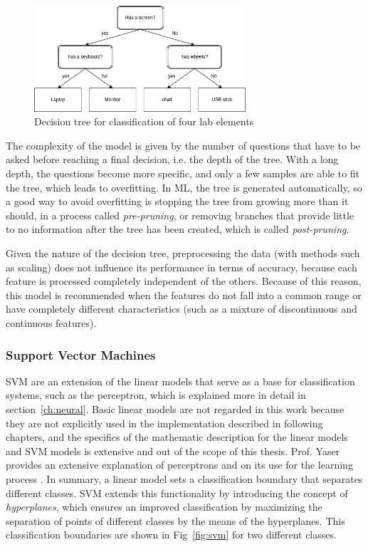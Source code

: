 \begin{figure}[!htb]
    \centering
      \includegraphics[width=0.7\textwidth]{figures/dt_example}
      \caption{Decision tree for classification of four lab elements}
      \label{fig:dt_example}
\end{figure}

The complexity of the model is given by the number of questions that have to be asked before reaching a final decision, i.e. the depth of the tree. With a long depth, the questions become more specific, and only a few samples are able to fit the tree, which leads to overfitting. In \ac{ML}, the tree is generated automatically, so a good way to avoid overfitting is stopping the tree from growing more than it should, in a process called \emph{pre-pruning}, or removing branches that provide little to no information after the tree has been created, which is called \emph{post-pruning}.

Given the nature of the decision tree, preprocessing the data (with methods such as scaling) does not influence its performance in terms of accuracy, because each feature is processed completely independent of the others. Because of this reason, this model is recommended when the features do not fall into a common range or have completely different characteristics (such as a mixture of discontinuous and continuous features).

\subsubsection{Support Vector Machines}
\ac{SVM} are an extension of the linear models that serve as a base for classification systems, such as the perceptron, which is explained more in detail in section~\ref{ch:neural}. Basic linear models are not regarded in this work because they are not explicitly used in the implementation described in following chapters, and the specifics of the mathematic description for the linear models and \ac{SVM} models is extensive and out of the scope of this thesis. Prof. Yaser provides an extensive explanation of perceptrons and on its use for the learning process \cite{Yaser}. In summary, a linear model sets a classification boundary that separates different classes. \ac{SVM} extends this functionality by introducing the concept of \emph{hyperplanes}, which ensures an improved classification by maximizing the separation of points of different classes by the means of the hyperplanes. This classification boundaries are shown in Fig~\ref{fig:svm} for two different classes.

